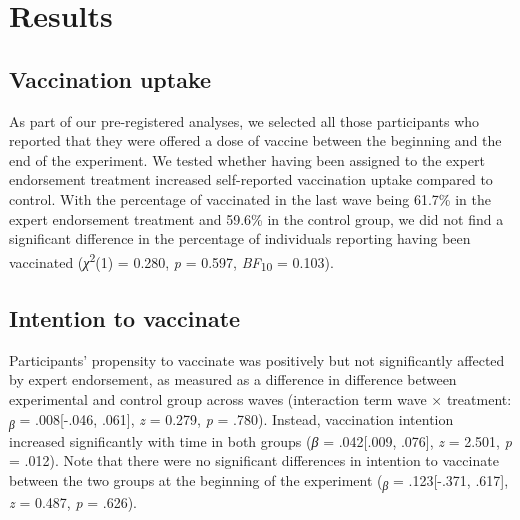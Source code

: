 \documentclass[authordate, empirical]{jote-new-article}
\begin{document}
	\section{Results}



	\subsection{ Vaccination uptake}



	As part of our pre-registered analyses, we selected all those participants who reported that they were offered a dose of vaccine between the beginning and the end of the experiment. We tested whether having been assigned to the expert endorsement treatment increased self-reported vaccination uptake compared to control. With the percentage of vaccinated in the last wave being 61.7\% in the expert endorsement treatment and 59.6\% in the control group, we did not find a significant difference in the percentage of individuals reporting having been vaccinated (\emph{χ}\textsuperscript{2}(1) = 0.280, \emph{p }= 0.597, \emph{BF}\textsubscript{10 }= 0.103).



	\subsection{Intention to vaccinate}



	Participants' propensity to vaccinate was positively but not significantly affected by expert endorsement, as measured as a difference in difference between experimental and control group across waves (interaction term wave × treatment: \textsubscript{\emph{β }}= .008[-.046, .061], \emph{z }= 0.279, \emph{p }= .780). Instead, vaccination intention increased significantly with time in both groups (\emph{β }= .042[.009, .076], \emph{z }= 2.501, \emph{p }= .012). Note that there were no significant differences in intention to vaccinate between the two groups at the beginning of the experiment (\textsubscript{\emph{β }}= .123[-.371, .617], \emph{z }= 0.487, \emph{p }= .626).
\end{document}
